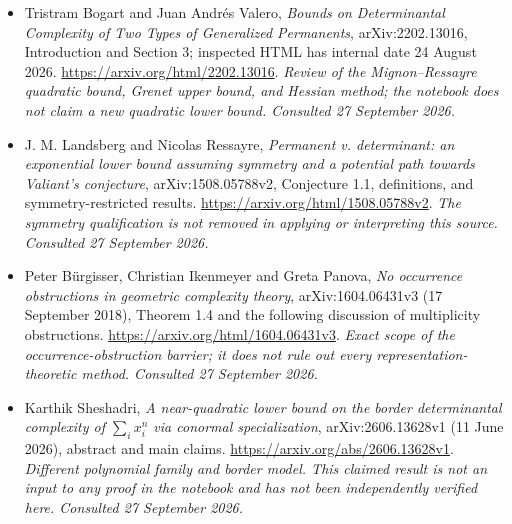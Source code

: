 \documentclass[11pt,a4paper]{article}
\numberwithin{equation}{section}
\begin{document}
\begin{itemize}
\item[\textnormal{[E1]}]\hypertarget{extra:57:1}{} Tristram Bogart and Juan Andr\'es Valero, \emph{Bounds on Determinantal Complexity of Two Types of Generalized Permanents}, arXiv:2202.13016, Introduction and Section 3; inspected HTML has internal date 24 August 2026.
\url{https://arxiv.org/html/2202.13016}.
{\small\textit{Review of the Mignon--Ressayre quadratic bound, Grenet upper bound, and Hessian method; the notebook does not claim a new quadratic lower bound. Consulted 27 September 2026.}}
\item[\textnormal{[E2]}]\hypertarget{extra:57:2}{} J. M. Landsberg and Nicolas Ressayre, \emph{Permanent v. determinant: an exponential lower bound assuming symmetry and a potential path towards Valiant's conjecture}, arXiv:1508.05788v2, Conjecture 1.1, definitions, and symmetry-restricted results.
\url{https://arxiv.org/html/1508.05788v2}.
{\small\textit{The symmetry qualification is not removed in applying or interpreting this source. Consulted 27 September 2026.}}
\item[\textnormal{[E3]}]\hypertarget{extra:57:3}{} Peter B\"urgisser, Christian Ikenmeyer and Greta Panova, \emph{No occurrence obstructions in geometric complexity theory}, arXiv:1604.06431v3 (17 September 2018), Theorem 1.4 and the following discussion of multiplicity obstructions.
\url{https://arxiv.org/html/1604.06431v3}.
{\small\textit{Exact scope of the occurrence-obstruction barrier; it does not rule out every representation-theoretic method. Consulted 27 September 2026.}}
\item[\textnormal{[E4]}]\hypertarget{extra:57:4}{} Karthik Sheshadri, \emph{A near-quadratic lower bound on the border determinantal complexity of $\sum_i x_i^n$ via conormal specialization}, arXiv:2606.13628v1 (11 June 2026), abstract and main claims.
\url{https://arxiv.org/abs/2606.13628v1}.
{\small\textit{Different polynomial family and border model. This claimed result is not an input to any proof in the notebook and has not been independently verified here. Consulted 27 September 2026.}}
\end{itemize}
\end{document}
